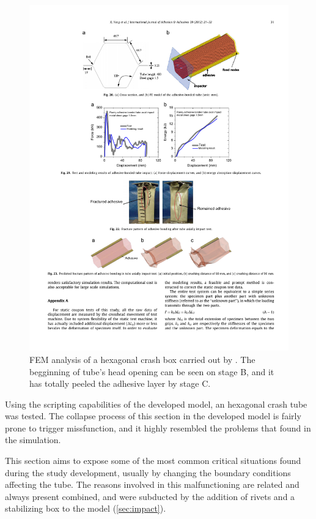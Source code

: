 \documentclass[
documentsize = a4, %
font = cmr, %
typesize = 11, %
printmode = true,
onehalfspacing = true,
language = en, %
titlepage = udciccp, %
degree = pt, %
dedication = true,
acknowledgements = true,
abstract-en = true,
abstract-es = false,
abstract-ga = false,
epigraphs = true,
toc = true,
lof = true,
lot = true,
frontmatterintoc = false,
notation = false,
minimal = false,
]{UDCthesis}
\begin{document}
\begin{figure}
	\centering
	\includegraphics[width=0.9\linewidth]{IMG_CUTRES/yangs_tube}
	\caption[\Acrshort{FEM} analysis of a hexagonal crash box carried out by \citet{Yang2012}.]{\Acrshort{FEM} analysis of a hexagonal crash box carried out by \citet{Yang2012}. The begginning of tube's head opening can be seen on stage B, and it has totally peeled the adhesive layer by stage C.}
	\label{fig:yangs_tube}
\end{figure}

Using the scripting capabilities of the developed model, an hexagonal crash tube was tested. The collapse process of this section in the developed model is fairly prone to trigger missfunction, and it highly resembled the problems that \citet{Yang2012} found in the simulation.


This section aims to expose some of the most common critical situations found during the study development, usually by changing the boundary conditions affecting the tube. The reasons involved in this malfunctioning are related and always present combined, and were subducted by the addition of rivets and a stabilizing box to the model (\cref{sec:impact}).
\end{document}
